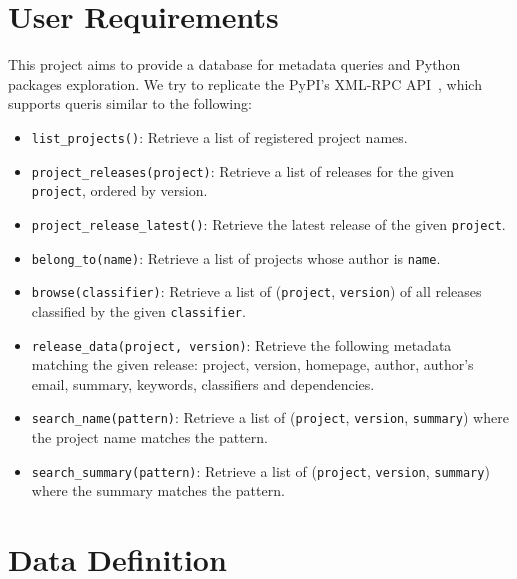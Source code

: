 \documentclass[a4paper,12pt]{article}
\begin{document}
\section{User Requirements}\label{req}
This project aims to provide a database for metadata queries and Python packages
exploration.  We try to replicate the PyPI's XML-RPC API~\cite{xmlrpc},
which supports queris similar to the following:
\begin{itemize}
  \item \verb|list_projects()|: Retrieve a list of registered project names.
  \item \verb|project_releases(project)|: Retrieve a list of releases for
    the given \verb|project|, ordered by version.
  \item \verb|project_release_latest()|: Retrieve the latest release
    of the given \verb|project|.
  \item \verb|belong_to(name)|: Retrieve a list of projects whose author
    is \verb|name|.
  \item \verb|browse(classifier)|: Retrieve a list of (\verb|project|,
    \verb|version|) of all releases classified by the given \verb|classifier|.
  \item \verb|release_data(project, version)|: Retrieve the following metadata
    matching the given release: project, version, homepage, author,
    author's email, summary, keywords, classifiers and dependencies.
  \item \verb|search_name(pattern)|: Retrieve a list of (\verb|project|,
    \verb|version|, \verb|summary|) where the project name matches the pattern.
  \item \verb|search_summary(pattern)|: Retrieve a list of (\verb|project|,
    \verb|version|, \verb|summary|) where the summary matches the pattern.
\end{itemize}

\section{Data Definition}
\end{document}

